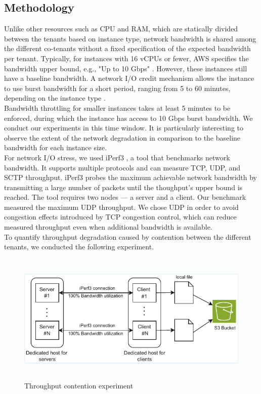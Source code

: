 \subsection{Methodology}
Unlike other resources such as CPU and RAM, which are statically divided between the tenants 
based on instance type, network bandwidth is shared among the different co-tenants without a fixed
specification of the expected bandwidth per tenant. Typically, for instances with 16 vCPUs or fewer, 
AWS specifies the bandwidth upper bound, e.g., "Up to 10 Gbps" \cite{network_bandwidth}. However, these 
instances still have a baseline bandwidth. A network I/O credit mechanism 
allows the instance to use burst bandwidth for a short period, ranging from 5 to 60 minutes,
depending on the instance type \cite{network_bandwidth}. \\
Bandwidth throttling for smaller instances takes at least 5 minutes to be enforced, during which the instance
has access to 10 Gbps burst bandwidth. We conduct our experiments in this time window. It is particularly 
interesting to observe the extent of the network degradation in comparison to the baseline bandwidth 
for each instance size.  \\
For network I/O stress, we used iPerf3 \cite{iperf}, a tool that benchmarks network 
bandwidth. It supports multiple protocols and can measure TCP, UDP, and SCTP 
throughput. iPerf3 probes the maximum achievable network bandwidth by transmitting a large number 
of packets until the thoughput's upper bound is reached. The tool requires two nodes — a 
server and a client. Our benchmark measured the 
maximum UDP throughput. We chose UDP in order to avoid congestion 
effects introduced by TCP congestion control, which can reduce measured throughput even
when additional bandwidth is available. \\
To quantify throughput degradation caused by contention between the different tenants, 
we conducted the following experiment. 
\begin{figure}[H]
  \centering
  \includegraphics[width=14.5cm, height=6.25cm]{figures/netexp}
  \caption{Throughput contention experiment}
  \label{fig:netexp}
\end{figure}
